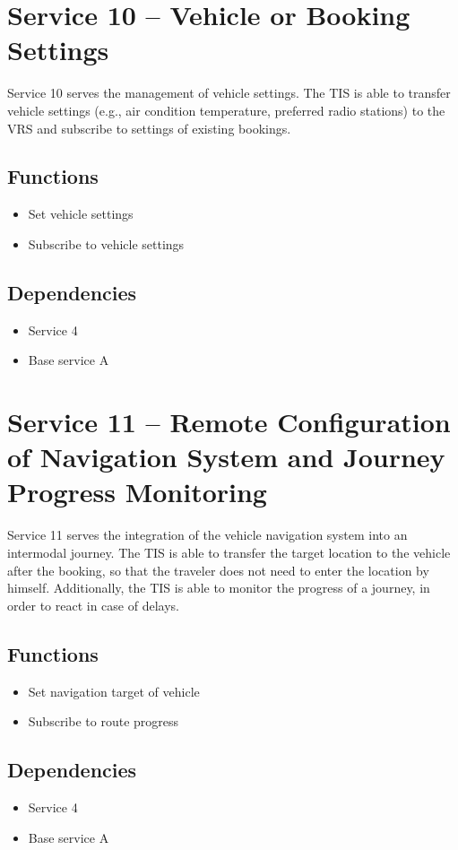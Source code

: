 \section{Service 10 -- Vehicle or Booking Settings}
Service 10 serves the management of vehicle settings. The TIS is able to transfer vehicle settings (e.g., air condition temperature, preferred radio stations) to the VRS and subscribe to settings of existing bookings.

\subsection*{Functions}
\begin{itemize}
\item Set vehicle settings 
\item Subscribe to vehicle settings
\end{itemize}

\subsection*{Dependencies}
\begin{itemize}
\item Service 4
\item Base service A
\end{itemize}

\section{Service 11 -- Remote Configuration of Navigation System and Journey Progress Monitoring}
Service 11 serves the integration of the vehicle navigation system into an intermodal journey. The TIS is able to transfer the target location to the vehicle after the booking, so that the traveler does not need to enter the location by himself. Additionally, the TIS is able to monitor the progress of a journey, in order to react in case of delays.

\subsection*{Functions}
\begin{itemize}
\item Set navigation target of vehicle
\item Subscribe to route progress
\end{itemize}

\subsection*{Dependencies}
\begin{itemize}
\item Service 4
\item Base service A
\end{itemize}

